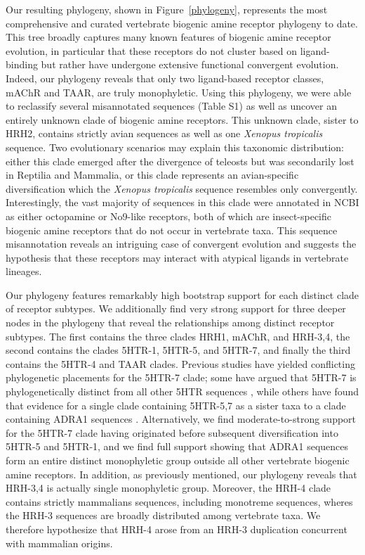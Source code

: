 \documentclass[fleqn,10pt]{wlpeerj}
\begin{document}
Our resulting phylogeny, shown in Figure~\ref{phylogeny}, represents the most comprehensive and curated vertebrate biogenic amine receptor phylogeny to date. This tree broadly captures many known features of biogenic amine receptor evolution, in particular that these receptors do not cluster based on ligand-binding but rather have undergone extensive functional convergent evolution. Indeed, our phylogeny reveals that only two ligand-based receptor classes, mAChR and TAAR, are truly monophyletic. Using this phylogeny, we were able to reclassify several misannotated sequences (Table S1) as well as uncover an entirely unknown clade of biogenic amine receptors. This unknown clade, sister to HRH2, contains strictly avian sequences as well as one \emph{Xenopus tropicalis} sequence. Two evolutionary scenarios may explain this taxonomic distribution: either this clade emerged after the divergence of teleosts but was secondarily lost in Reptilia and Mammalia, or this clade represents an avian-specific diversification which the \emph{Xenopus tropicalis} sequence resembles only convergently. Interestingly, the vast majority of sequences in this clade were annotated in NCBI as either octopamine or No9-like receptors, both of which are insect-specific biogenic amine receptors that do not occur in vertebrate taxa. This sequence misannotation reveals an intriguing case of convergent evolution and suggests the hypothesis that these receptors may interact with atypical ligands in vertebrate lineages.

Our phylogeny features remarkably high bootstrap support for each distinct clade of receptor subtypes. We additionally find very strong support for three deeper nodes in the phylogeny that reveal the relationships among distinct receptor subtypes. The first contains the three clades HRH1, mAChR, and HRH-3,4, the second contains the clades 5HTR-1, 5HTR-5, and 5HTR-7, and finally the third contains the 5HTR-4 and TAAR clades. Previous studies have yielded conflicting phylogenetic placements for the 5HTR-7 clade; some have argued that 5HTR-7 is phylogenetically distinct from all other 5HTR sequences \citep{KakaralaJamil2014}, while others have found that evidence for a single clade containing 5HTR-5,7 as a sister taxa to a clade containing ADRA1 sequences \citep{Fredrikssonetal2003}. Alternatively, we find moderate-to-strong support for the 5HTR-7 clade having originated before subsequent diversification into 5HTR-5 and 5HTR-1, and we find full support showing that ADRA1 sequences form an entire distinct monophyletic group outside all other vertebrate biogenic amine receptors. In addition, as previously mentioned, our phylogeny reveals that HRH-3,4 is actually single monophyletic group. Moreover, the HRH-4 clade contains strictly mammalians sequences, including monotreme sequences, wheres the HRH-3 sequences are broadly distributed among vertebrate taxa. We therefore hypothesize that HRH-4 arose from an HRH-3 duplication concurrent with mammalian origins.
\end{document}
